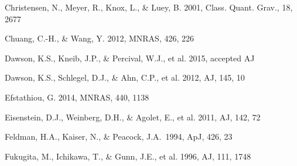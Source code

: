 \documentclass[iop]{emulateapj}
\begin{document}
\begin{thebibliography}{}




Christensen, N., Meyer, R., Knox, L., \& Luey, B. 2001, Class. Quant. Grav., 18, 2677


Chuang, C.-H., \& Wang, Y. 2012, MNRAS, 426, 226  



Dawson, K.S., Kneib, J.P., \& Percival, W.J., et al. 2015, accepted AJ

Dawson, K.S., Schlegel, D.J., \& Ahn, C.P., et al. 2012, AJ, 145, 10

Efstathiou, G. 2014, MNRAS, 440, 1138

Eisenstein, D.J.,  Weinberg, D.H., \& Agolet, E., et al. 2011, AJ, 142, 72

Feldman, H.A., Kaiser, N., \& Peacock, J.A.\ 1994, ApJ, 426, 23 

Fukugita, M., Ichikawa, T., \& Gunn, J.E., et al. 1996, AJ, 111, 1748






\end{thebibliography}
\end{document}
